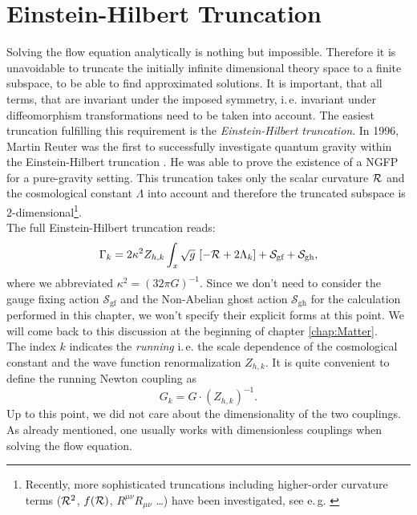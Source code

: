 \section{Einstein-Hilbert Truncation}
Solving the flow equation analytically is nothing but impossible. Therefore it is unavoidable to truncate the initially infinite dimensional theory space to a finite subspace, to be able to find approximated solutions. It is important, that all terms, that are invariant under the imposed symmetry, i.\,e. invariant under diffeomorphism transformations need to be taken into account. The easiest truncation fulfilling this requirement is the \textit{Einstein-Hilbert truncation}. In 1996, Martin Reuter was the first to successfully investigate quantum gravity within the Einstein-Hilbert truncation \cite{Reuter1996}. He was able to prove the existence of a NGFP for a pure-gravity setting. This truncation takes only the scalar curvature $\mathcal{R}$ and the cosmological constant $\Lambda$ into account and therefore the truncated subspace is $2$-dimensional\footnote{Recently, more sophisticated truncations including higher-order curvature terms ($\mathcal{R}^2$, $f(\mathcal{R})$, $R^{\mu\nu}R_{\mu\nu}$ \dots) have been investigated, see e.\,g. \cite{AlkoferSaueressig2018}}.\\ The full Einstein-Hilbert  truncation reads:
\begin{align}
	\Gamma_{k} = 2\kappa^2Z_{h,k} \int_x \sqrt{g} \ [-\mathcal{R} + 2\Lambda_k] + \mathcal{S}_{\text{gf}} + \mathcal{S}_{\text{gh}},
\label{eqn:EHtruncation}
\end{align}
where we abbreviated $\kappa^2 = \left(32\pi G\right)^{-1}$. Since we don't need to consider the gauge fixing action $\mathcal{S}_{\text{gf}}$ and the Non-Abelian ghost action $\mathcal{S}_{\text{gh}}$ for the calculation performed in this chapter, we won't specify their explicit forms at this point. We will come back to this discussion at the beginning of chapter \ref{chap:Matter}.\\
 The index $k$ indicates the \textit{running} i.\,e. the scale dependence of the cosmological constant and the wave function renormalization $Z_{h,k}$. It is quite convenient to define the running Newton coupling as 
 \begin{equation}
 	G_k = G \cdot \left(Z_{h,k}\right)^{-1}.
 \end{equation}
Up to this point, we did not care about the dimensionality of the two couplings. As already mentioned, one usually works with dimensionless couplings when solving the flow equation. \\
